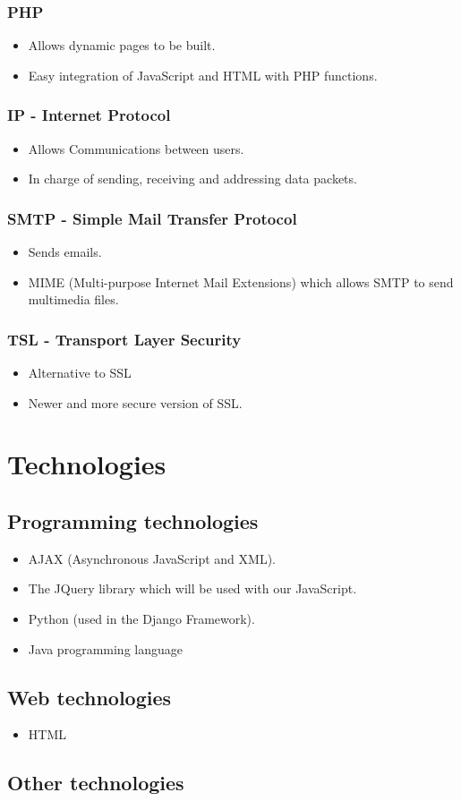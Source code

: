 \documentclass[12pt, oneside]{article}
\begin{document}
		\subsubsection{PHP}
			\begin{itemize}
				\item Allows dynamic pages to be built.
				\item Easy integration of JavaScript and HTML with PHP functions.
			\end{itemize}
		\subsubsection{IP - Internet Protocol}	
			\begin{itemize}
				\item Allows Communications between users.
				\item In charge of sending, receiving and addressing data packets.
			\end{itemize}				
		\subsubsection{SMTP - Simple Mail Transfer Protocol}
			\begin{itemize}
				\item Sends emails.
				\item MIME (Multi-purpose Internet Mail Extensions) which allows SMTP to send multimedia files.
			\end{itemize}
		\subsubsection{TSL - Transport Layer Security}
			\begin{itemize}
				\item Alternative to SSL
				\item Newer and more secure version of SSL.
			\end{itemize}
		
\section{Technologies}
	\subsection{Programming technologies}
		\begin{itemize}
			\item AJAX (Asynchronous JavaScript and XML).
			\item The JQuery library which will be used with our JavaScript.
			\item Python (used in the Django Framework).
			\item Java programming language 
		\end{itemize}
	\subsection{Web technologies}
		\begin{itemize}
			\item HTML
		\end{itemize}
	\subsection{Other technologies}
		\begin{itemize}
			
		\end{itemize}
\end{document}
